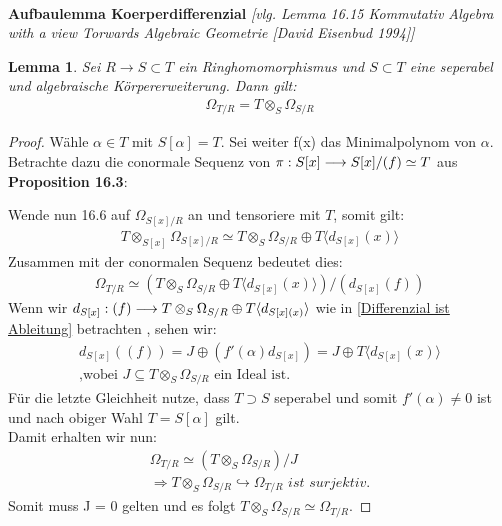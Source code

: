 \documentclass[10pt,a4paper]{report}
\newcommand{\comment}[1]{}
\newcommand{\ModulsOfDifferenzials}{Kommutativ Algebra with a view Torwards Algebraic Geometrie [David Eisenbud 1994]}
\newcounter{Aussage}[chapter]
\newtheorem{lemma}[Aussage]{Lemma}
\newcommand{\functionfront}[3]{\nolinebreak{#1:#2 \longrightarrow #3}}
\newcommand{\divR}[2]{\Omega_{#1/#2}}
\newcommand{\divf}[1]{d_{#1}}
\newcommand{\Tensor}[3]{#1 \otimes_{#2} #3}
\newcommand{\tensor}[3]{#1 \otimes #3}
\begin{document}
\ \\
\textbf{Aufbaulemma Koerperdifferenzial} \textit{[vlg. Lemma 16.15 \ModulsOfDifferenzials]}
\begin{lemma}\label{Aufbaulemma Koerperdifferenzial}
Sei $R \longrightarrow S \subset T$ ein Ringhomomorphismus und $S \subset T$ eine seperabel und algebraische Körpererweiterung. Dann gilt:
\begin{gather*}
\divR{T}{R} = \Tensor{T}{S}{\divR{S}{R}}
\end{gather*}
\end{lemma}
\begin{proof}
Wähle $\alpha \in T$ mit $S[\alpha] = T$. Sei weiter f(x) das Minimalpolynom von $\alpha$. Betrachte dazu die conormale Sequenz von  $\functionfront{\pi}{S[x]}{S[x]/(f) \simeq T}$ aus \comment{\cref{prop16.3}} \textbf{Proposition 16.3}:
\begin{center}
\end{center}
Wende nun 16.6 auf $\divR{S[x]}{R}$ an und tensoriere mit $T$, somit gilt:
\begin{gather*}
\Tensor{T}{S[x]}{\divR{S[x]}{R}} \simeq \Tensor{T}{S}{\divR{S}{R}} \oplus T\langle \divf{S[x]}(x) \rangle
\end{gather*}
Zusammen mit der conormalen Sequenz bedeutet dies:
\begin{gather*}
\divR{T}{R} \simeq (\Tensor{T}{S}{\divR{S}{R}} \oplus T\langle \divf{S[x]}(x) \rangle)/(\divf{S[x]}(f))
\end{gather*}
Wenn wir $\functionfront{\divf{S[x]}}{(f)}{\Tensor{T}{S}{\divR{S}{R}} \oplus T\langle \divf{S[x](x)} \rangle}$ wie in \cref{Differenzial ist Ableitung} betrachten , sehen wir:
\begin{gather*}
\divf{S[x]}((f)) = J \oplus (f'(\alpha)\divf{S[x]}) = J \oplus T\langle \divf{S[x]}(x) \rangle \\
\text{,wobei $J \subseteq \Tensor{T}{S}{\divR{S}{R}}$ ein Ideal ist.}
\end{gather*}
Für die letzte Gleichheit nutze, dass $T \supset S$ seperabel und somit $f'(\alpha) \neq 0$ ist und nach obiger Wahl $T = S[\alpha]$ gilt.\\
Damit erhalten wir nun:
\begin{gather*}
\divR{T}{R} \simeq (\Tensor{T}{S}{\divR{S}{R}})/J \\
\Rightarrow \Tensor{T}{S}{\divR{S}{R}} \hookrightarrow \divR{T}{R} \textit{ ist surjektiv.}
\end{gather*}
Somit muss J = 0 gelten und es folgt $\Tensor{T}{S}{\divR{S}{R}} \simeq \divR{T}{R}$.
\end{proof}
\end{document}
